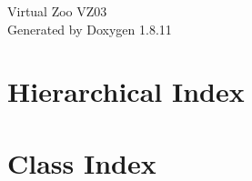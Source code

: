 \documentclass[twoside]{book}
\newcommand{\+}{\discretionary{\mbox{\scriptsize$\hookleftarrow$}}{}{}}
\newcommand{\clearemptydoublepage}{%
  \newpage{\pagestyle{empty}\cleardoublepage}%
}
\begin{document}
\hypersetup{pageanchor=false,
             bookmarksnumbered=true,
             pdfencoding=unicode
            }
\begin{titlepage}
\vspace*{7cm}
\begin{center}%
{\Large Virtual Zoo V\+Z03 }\\
\vspace*{1cm}
{\large Generated by Doxygen 1.8.11}\\
\end{center}
\end{titlepage}
\clearemptydoublepage
\tableofcontents
\clearemptydoublepage
{}
\hypersetup{pageanchor=true}

\chapter{Hierarchical Index}

\chapter{Class Index}

\end{document}
